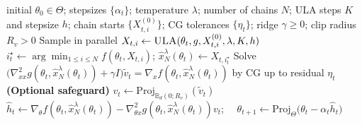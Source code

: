 \documentclass{article}
\theoremstyle{normaltheorem}
\begin{document}
\begin{algorithm}[t]
\caption{\textsc{HG-MS}: Hyper-gradient with minima selection}
\begin{algorithmic}[1]
\Require initial $\theta_0\in\Theta$; stepsizes $\{\alpha_t\}$; temperature $\lambda$; number of chains $N$; ULA steps $K$ and stepsize $h$; chain starts $\{X^{(0)}_{t,i}\}$; CG tolerances $\{\eta_t\}$; ridge $\gamma\ge 0$; clip radius $R_v>0$
    \State Sample in parallel $X_{t,i}\gets \textsc{ULA}(\theta_t,g,X^{(0)}_{t,i},\lambda,K,h)$
    \State $i_t^\star\gets\arg\min_{1\le i\le N} f(\theta_t,X_{t,i})$; \quad
    $\hat{x}_N^\lambda(\theta_t)\gets X_{t,i_t^\star}$
    \State Solve
    \(
        \big(\nabla^2_{xx}g(\theta_t,\hat{x}_N^\lambda(\theta_t))+\gamma I\big)\tilde v_t
        =
        \nabla_x f(\theta_t,\hat{x}_N^\lambda(\theta_t))
    \)
    by CG up to residual $\eta_t$
    \State \textbf{(Optional safeguard)} $v_t\gets \mathrm{Proj}_{\mathbb B_d(0;R_v)}(\tilde v_t)$
    \State $\widehat h_t\gets
    \nabla_\theta f(\theta_t,\hat{x}_N^\lambda(\theta_t))
    -
    \nabla^2_{\theta x}g(\theta_t,\hat{x}_N^\lambda(\theta_t))v_t$; $\quad \theta_{t+1}\gets
    \mathrm{Proj}_{\Theta}\big(\theta_t-\alpha_t\widehat h_t\big)$
\EndFor
\end{algorithmic}
\label{alg:hg-minsel-lmc}
\end{algorithm}
\end{document}
